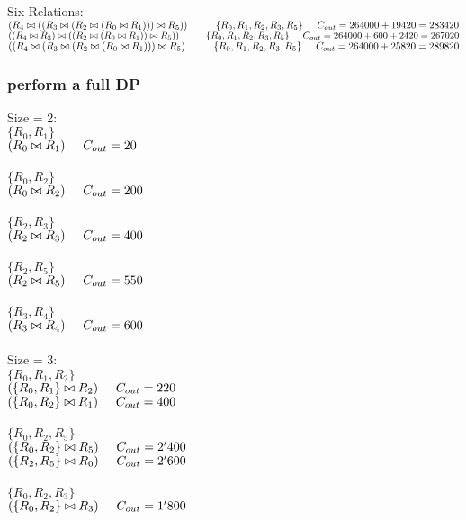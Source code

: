 \documentclass[11pt, a4]{article}
\newcommand\tab[1][0.5cm]{\hspace*{#1}}
\def\join{\bowtie}%
\begin{document}
Six Relations:\\
\sout{$(R_4 \join ((R_3 \join (R_2 \join (R_0 \join R_1))) \join R_5)) \tab\tab \{R_0, R_1, R_2, R_3, R_5\} \tab C_{out} = 264000 + 19420 = 283420 $}\\
{\color{red}$((R_4 \join R_3) \join ((R_2 \join (R_0 \join R_1)) \join R_5)) \tab\tab \{R_0, R_1, R_2, R_3, R_5\} \tab C_{out} = 264000 + 600 + 2420 = 267020 $}\\
\sout{$((R_4 \join (R_3 \join (R_2 \join (R_0 \join R_1))) \join R_5) \tab\tab \{R_0, R_1, R_2, R_3, R_5\} \tab C_{out} = 264000 + 25820 = 289820$} \\


\subsubsection{perform a full DP}
Size = 2:\\
$\{R_0, R_1\}$\\
\tab $(R_0 \bowtie R_1) \tab C_{out} = 20$\\
\\
$\{R_0, R_2\}$\\
\tab $(R_0 \bowtie R_2) \tab C_{out} = 200$\\
\\
$\{R_2, R_3\}$\\
\tab $(R_2 \bowtie R_3) \tab C_{out} = 400$\\
\\
$\{R_2, R_5\}$\\
\tab $(R_2 \bowtie R_5) \tab C_{out} = 550$\\
\\
$\{R_3, R_4\}$\\
\tab $(R_3 \bowtie R_4) \tab C_{out} = 600$\\
\\
Size = 3:\\
$\{R_0, R_1, R_2\}$\\
\tab $(\{R_0, R_1\} \bowtie R_2) \tab C_{out} = 220$\\
\tab \sout{$(\{R_0, R_2\} \bowtie R_1) \tab C_{out} = 400$}\\
\\
$\{R_0, R_2, R_5\}$\\
\tab $(\{R_0, R_2\} \bowtie R_5) \tab C_{out} = 2'400$\\
\tab \sout{$(\{R_2, R_5\} \bowtie R_0) \tab C_{out} = 2'600$}\\
\\
$\{R_0, R_2, R_3\}$\\
\tab $(\{R_0, R_2\} \bowtie R_3) \tab C_{out} = 1'800$\\
\end{document}
